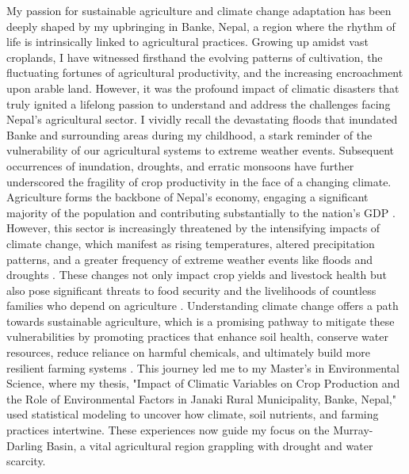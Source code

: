 My passion for sustainable agriculture and climate change adaptation has been deeply shaped by my upbringing in Banke, Nepal, a region where the rhythm of life is intrinsically linked to agricultural practices. Growing up amidst vast croplands, I have witnessed firsthand the evolving patterns of cultivation, the fluctuating fortunes of agricultural productivity, and the increasing encroachment upon arable land. However, it was the profound impact of climatic disasters that truly ignited a lifelong passion to understand and address the challenges facing Nepal’s agricultural sector. I vividly recall the devastating floods that inundated Banke and surrounding areas during my childhood, a stark reminder of the vulnerability of our agricultural systems to extreme weather events. Subsequent occurrences of inundation, droughts, and erratic monsoons have further underscored the fragility of crop productivity in the face of a changing climate. Agriculture forms the backbone of Nepal’s economy, engaging a significant majority of the population and contributing substantially to the nation’s GDP  \parencite{krupnikAgronomicSocioeconomicEnvironmental2021}. However, this sector is increasingly threatened by the intensifying impacts of climate change, which manifest as rising temperatures, altered precipitation patterns, and a greater frequency of extreme weather events like floods and droughts \parencite{dawadiImpactClimateChange2022}. These changes not only impact crop yields and livestock health but also pose significant threats to food security and the livelihoods of countless families who depend on agriculture \parencite{risalImpactClimateChange2022}. Understanding climate change offers a path towards sustainable agriculture, which is a promising pathway to mitigate these vulnerabilities by promoting practices that enhance soil health, conserve water resources, reduce reliance on harmful chemicals, and ultimately build more resilient farming systems \parencite{factors_dahal_2021}. This journey led me to my Master’s in Environmental Science, where my thesis, "Impact of Climatic Variables on Crop Production and the Role of Environmental Factors in Janaki Rural Municipality, Banke, Nepal," used statistical modeling to uncover how climate, soil nutrients, and farming practices intertwine. These experiences now guide my focus on the Murray-Darling Basin, a vital agricultural region grappling with drought and water scarcity. 

